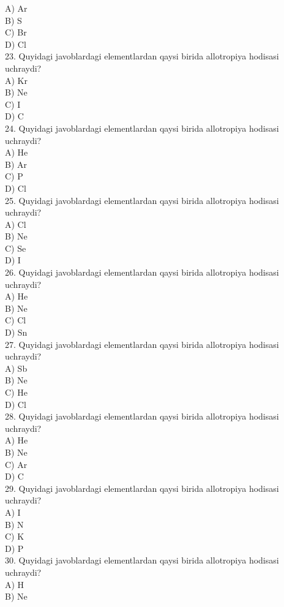 A) Ar\\
B) S\\
C) Br\\
D) Cl\\
23. Quyidagi javoblardagi elementlardan qaysi birida allotropiya hodisasi uchraydi?\\
A) Kr\\
B) Ne\\
C) I\\
D) C\\
24. Quyidagi javoblardagi elementlardan qaysi birida allotropiya hodisasi uchraydi?\\
A) He\\
B) Ar\\
C) P\\
D) Cl\\
25. Quyidagi javoblardagi elementlardan qaysi birida allotropiya hodisasi uchraydi?\\
A) Cl\\
B) Ne\\
C) Se\\
D) I\\
26. Quyidagi javoblardagi elementlardan qaysi birida allotropiya hodisasi uchraydi?\\
A) He\\
B) Ne\\
C) Cl\\
D) Sn\\
27. Quyidagi javoblardagi elementlardan qaysi birida allotropiya hodisasi uchraydi?\\
A) Sb\\
B) Ne\\
C) He\\
D) Cl\\
28. Quyidagi javoblardagi elementlardan qaysi birida allotropiya hodisasi uchraydi?\\
A) He\\
B) Ne\\
C) Ar\\
D) C\\
29. Quyidagi javoblardagi elementlardan qaysi birida allotropiya hodisasi uchraydi?\\
A) I\\
B) N\\
C) K\\
D) P\\
30. Quyidagi javoblardagi elementlardan qaysi birida allotropiya hodisasi uchraydi?\\
A) H\\
B) Ne\\

